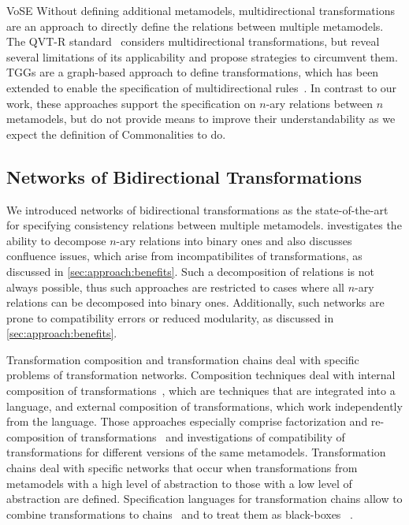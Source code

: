 \begin{copiedFrom}{VoSE}
Without defining additional metamodels, multidirectional transformations are an approach to directly define the relations between multiple metamodels.
The QVT-R standard~\cite{qvt} considers multidirectional transformations, but \textcite{macedo2014a} reveal several limitations of its applicability and propose strategies to circumvent them.
\acp{TGG} are a graph-based approach to define transformations, which has been extended to enable the specification of multidirectional rules~\cite{trollmann2015a, trollmann2016a}.
In contrast to our work, these approaches support the specification on $n$-ary relations between $n$ metamodels, but do not provide means to improve their understandability as we expect the definition of Commonalities to do.


\subsection*{Networks of Bidirectional Transformations}

We introduced networks of bidirectional transformations as the state-of-the-art for specifying consistency relations between multiple metamodels.
\textcite{stevens2017a} investigates the ability to decompose $n$-ary relations into binary ones and also discusses confluence issues, which arise from incompatibilites of transformations, as discussed in \autoref{sec:approach:benefits}.
Such a decomposition of relations is not always possible, thus such approaches are restricted to cases where all $n$-ary relations can be decomposed into binary ones.
Additionally, such networks are prone to compatibility errors or reduced modularity, as discussed in \autoref{sec:approach:benefits}.

Transformation composition and transformation chains deal with specific problems of transformation networks.
Composition techniques deal with internal composition of transformations~\cite{wagelaar2008a}, which are techniques that are integrated into a language, and external composition of transformations, which work independently from the language.
Those approaches especially comprise factorization and re-composition of transformations~\cite{cuadrado2008a} and investigations of compatibility of transformations for different versions of the same metamodels.
Transformation chains deal with specific networks that occur when transformations from metamodels with a high level of abstraction to those with a low level of abstraction are defined.
Specification languages for transformation chains %
allow to combine transformations to chains~\cite{lucio2013a} and to treat them as black-boxes%
~\cite{vanhooff2006a, vanhooff2007UniTI-MODELS}. 



\end{copiedFrom}
